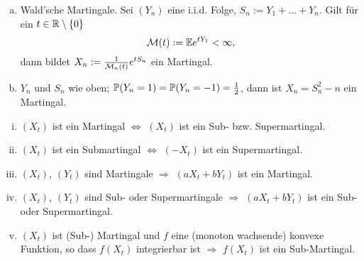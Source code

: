 \begin{prgp}[Aufgabe]
  \begin{enumerate}[a)]
  \item Wald'sche Martingale. Sei $(Y_n)$ eine i.i.d. Folge, $S_n := Y_1 +
    \ldots + Y_n$. Gilt für ein $t \in \mathbb{R} \setminus \{ 0 \}$
    \[ \mathcal{M}(t) := \mathbb{E} e^{t Y_1} < \infty, \]
    dann bildet $X_n := \frac{1}{\mathcal{M}_n(t)} e^{t S_n}$ ein Martingal.
  \item $Y_n$ und $S_n$ wie oben; $\mathbb{P}(Y_n = 1) = \mathbb{P}(Y_n = -1) = \frac{1}{2}$, dann
    ist $X_n = S_n^2 - n$ ein Martingal.
  \end{enumerate}
\end{prgp}

\begin{prgp}[Aufgabe]
  \begin{enumerate}[i)]
  \item $(X_t)$ ist ein Martingal $\Leftrightarrow$ $(X_t)$ ist ein Sub- bzw.
    Supermartingal.
  \item $(X_t)$ ist ein Submartingal $\Leftrightarrow$ $(-X_t)$ ist ein
    Supermartingal.
  \item $(X_t)$, $(Y_t)$ sind Martingale $\Rightarrow$ $(aX_t + bY_t)$ ist ein
    Martingal.
  \item $(X_t)$, $(Y_t)$ sind Sub- oder Supermartingale $\Rightarrow$ $(aX_t +
    bY_t)$ ist ein Sub- oder Supermartingal.
  \item $(X_t)$ ist (Sub-) Martingal und $f$ eine (monoton wachsende) konvexe
    Funktion, so dass $f(X_t)$ integrierbar ist $\Rightarrow$ $f(X_t)$ ist ein
    Sub-Martingal.
  \end{enumerate}
\end{prgp}
